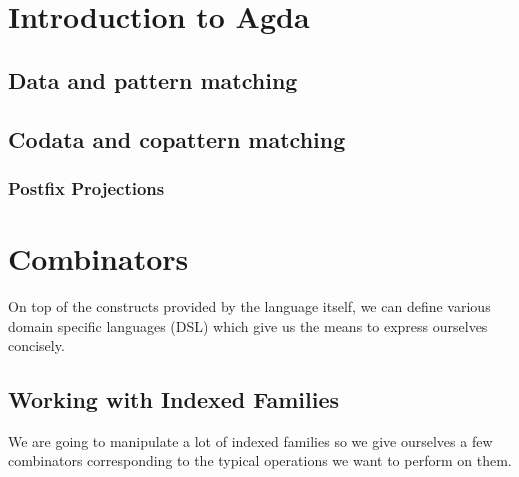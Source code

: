 \section{Introduction to Agda}

\subsection{Data and pattern matching}

\subsection{Codata and copattern matching}

\subsubsection{Postfix Projections}

\section{Combinators}

On top of the constructs provided by the language itself, we can define various
domain specific languages (DSL) which give us the means to express ourselves
concisely.

\subsection{Working with Indexed Families}
\label{indexed-combinators}

We are going to manipulate a lot of indexed families so we give ourselves a few
combinators corresponding to the typical operations we want to perform on them.

